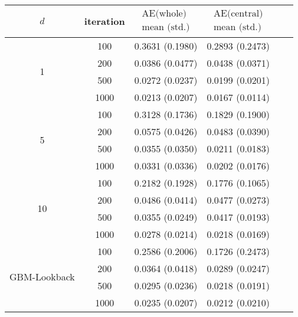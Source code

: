 \documentclass[11pt,a4paper]{article}
\theoremstyle{remark}
\begin{document}
	\begin{table}[H]
		\centering
		\begin{tabular}{cccccc}
			\hline$d$ & iteration & $\begin{array}{c}\text{AE(whole)} \\
				\text{mean (std.)} \end{array}$   & $\begin{array}{c}\text{AE(central)} \\
				\text{mean (std.)} \end{array}$  \\
			\hline \multirow{4}{*}{1} & 100 & 0.3631 (0.1980) & 0.2893 (0.2473) \\
			& 200 & 0.0386  (0.0477) & 0.0438 (0.0371) \\
			& 500 & 0.0272 (0.0237) & 0.0199 (0.0201) \\
			& 1000 & 0.0213 (0.0207) & 0.0167  (0.0114) \\
			
			\hline \multirow{4}{*}{5} & 100 & 0.3128 (0.1736) & 0.1829 (0.1900) \\
			& 200 & 0.0575 (0.0426) & 0.0483 (0.0390) \\
			& 500 & 0.0355 (0.0350) & 0.0211 (0.0183) \\
			& 1000 & 0.0331 (0.0336) & 0.0202 (0.0176) \\
			
			\hline \multirow{4}{*}{10} & 100 & 0.2182 (0.1928) & 0.1776 (0.1065) \\
			& 200 & 0.0486 (0.0414) & 0.0477 (0.0273) \\
			& 500 & 0.0355 (0.0249) & 0.0417 (0.0193) \\
			& 1000 & 0.0278 (0.0214) & 0.0218 (0.0169) \\
			
			\hline \multirow{4}{*}{GBM-Lookback} & 100 & 0.2586 (0.2006) & 0.1726 (0.2473) \\
			& 200 & 0.0364 (0.0418) & 0.0289 (0.0247) \\
			& 500 & 0.0295 (0.0236)  & 0.0218 (0.0191) \\
			& 1000 & 0.0235 (0.0207) & 0.0212 (0.0210) \\
			

\end{tabular}
\end{table}
\end{document}
